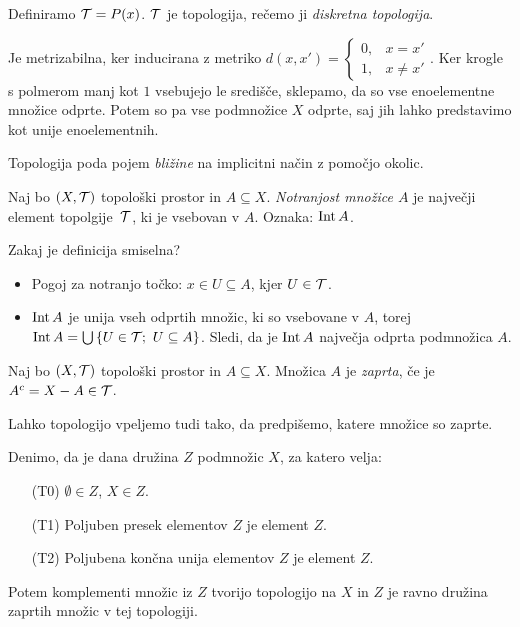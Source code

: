 \begin{primer}
    Definiramo $\mathcal{T} = P(x)$. $\mathcal{T}$ je topologija, rečemo ji \emph{diskretna topologija}.

    Je metrizabilna, ker inducirana z metriko $d(x, x') = 
    \begin{cases}
        0, &x = x' \\
        1, &x \neq x'    
    \end{cases}.$ Ker krogle s polmerom manj kot $1$ vsebujejo le središče, sklepamo, da so vse enoelementne množice odprte. Potem so pa vse podmnožice $X$ odprte, saj jih lahko predstavimo kot unije enoelementnih.
\end{primer}

\begin{opomba}
    Topologija poda pojem \emph{bližine} na implicitni način z pomočjo okolic. 
\end{opomba}

\begin{definicija}
    Naj bo $(X, \mathcal{T})$ topološki prostor in $A \subseteq X$. \emph{Notranjost množice $A$} je največji element topolgije~$\mathcal{T}$, ki je vsebovan v $A$. Oznaka: $\operatorname{Int} A$.
\end{definicija}

\begin{opomba}
    Zakaj je definicija smiselna?
    \begin{itemize}        
        \item Pogoj za notranjo točko: $x \in U \subseteq A$, kjer $U \in \mathcal{T}$.
        \item $\operatorname{Int} A$ je unija vseh odprtih množic, ki so vsebovane v $A$, torej $\operatorname{Int} A = \bigcup \left\{U \in \mathcal{T}; \ U \subseteq A\right\}$. Sledi, da je $\operatorname{Int} A$ največja odprta podmnožica $A$.
    \end{itemize}
\end{opomba}

\begin{definicija}
    Naj bo $(X, \mathcal{T})$ topološki prostor in $A \subseteq X$. Množica $A$ je \emph{zaprta}, če je $A^c = X - A \in \mathcal{T}$.
\end{definicija}

\begin{opomba}
    Lahko topologijo vpeljemo tudi tako, da predpišemo, katere množice so zaprte.

    Denimo, da je dana družina $Z$ podmnožic $X$, za katero velja:
    \begin{enumerate}
        \item[(T0)] $\emptyset \in Z$, $X \in Z$.
        \item[(T1)] Poljuben presek elementov $Z$ je element $Z$.
        \item[(T2)] Poljubena končna unija elementov $Z$ je element $Z$.
    \end{enumerate}
    Potem komplementi množic iz $Z$ tvorijo topologijo na $X$ in $Z$ je ravno družina zaprtih množic v tej topologiji.
\end{opomba}

